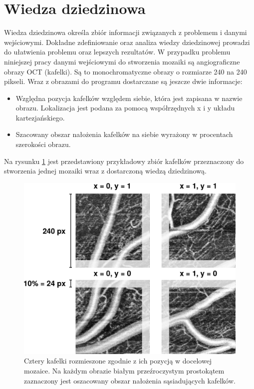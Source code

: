 \section{Wiedza dziedzinowa}
\label{sec:proponowane_algorytmy:wiedza_dziedzinowa}

Wiedza dziedzinowa określa zbiór informacji związanych z problemem i danymi wejściowymi. Dokładne zdefiniowanie oraz analiza wiedzy dziedzinowej prowadzi do ułatwienia problemu oraz lepszych rezultatów. W przypadku problemu niniejszej pracy danymi wejściowymi do stworzenia mozaiki są angiograficzne obrazy OCT (kafelki). Są to monochromatyczne obrazy o rozmiarze 240 na 240 pikseli. Wraz z obrazami do programu dostarczane są jeszcze dwie informacje:

\begin{itemize}
\item Względna pozycja kafelków względem siebie, która jest zapisana w nazwie obrazu. Lokalizacja jest podana za pomocą współrzędnych x i y układu kartezjańskiego.
\item Szacowany obszar nałożenia kafelków na siebie wyrażony w procentach szerokości obrazu.
\end{itemize}

Na rysunku \ref{fig:proponowane_algorytmy:example} jest przedstawiony przykładowy zbiór kafelków przeznaczony do stworzenia jednej mozaiki wraz z dostarczoną wiedzą dziedzinową.

\begin{figure}[H]
  \centering
  \includegraphics[width=\textwidth]{gfx/example}
  \caption{Cztery kafelki rozmieszone zgodnie z ich pozycją w docelowej mozaice. Na każdym obrazie białym przeźroczystym prostokątem zaznaczony jest oszacowany obszar nałożenia sąsiadujących kafelków.}
  \label{fig:proponowane_algorytmy:example}
\end{figure}

